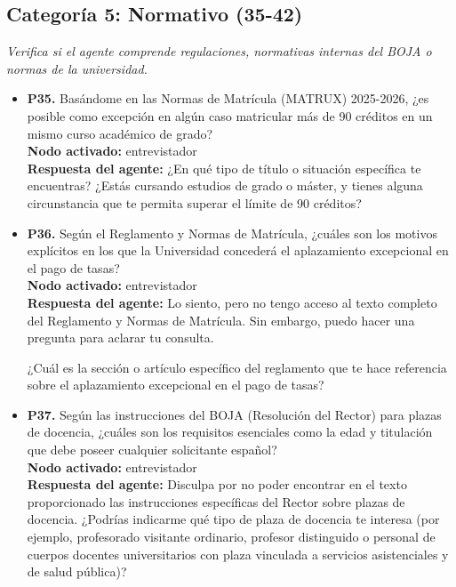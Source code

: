 \documentclass{article}
\begin{document}
\begin{itemize}
\end{itemize}

\subsection{Categoría 5: Normativo (35-42)}
\textit{Verifica si el agente comprende regulaciones, normativas internas del BOJA o normas de la universidad.}
\begin{itemize}
      \item \textbf{P35.} Basándome en las Normas de Matrícula (MATRUX) 2025-2026, ¿es posible como excepción en algún caso matricular más de 90 créditos en un mismo curso académico de grado? \\
            \textbf{Nodo activado:} entrevistador \\
            \textbf{Respuesta del agente:} ¿En qué tipo de título o situación específica te encuentras? ¿Estás cursando estudios de grado o máster, y tienes alguna circunstancia que te permita superar el límite de 90 créditos?

      \item \textbf{P36.} Según el Reglamento y Normas de Matrícula, ¿cuáles son los motivos explícitos en los que la Universidad concederá el aplazamiento excepcional en el pago de tasas? \\
            \textbf{Nodo activado:} entrevistador \\
            \textbf{Respuesta del agente:} Lo siento, pero no tengo acceso al texto completo del Reglamento y Normas de Matrícula. Sin embargo, puedo hacer una pregunta para aclarar tu consulta.

            ¿Cuál es la sección o artículo específico del reglamento que te hace referencia sobre el aplazamiento excepcional en el pago de tasas?

      \item \textbf{P37.} Según las instrucciones del BOJA (Resolución del Rector) para plazas de docencia, ¿cuáles son los requisitos esenciales como la edad y titulación que debe poseer cualquier solicitante español? \\
            \textbf{Nodo activado:} entrevistador \\
            \textbf{Respuesta del agente:} Disculpa por no poder encontrar en el texto proporcionado las instrucciones específicas del Rector sobre plazas de docencia. ¿Podrías indicarme qué tipo de plaza de docencia te interesa (por ejemplo, profesorado visitante ordinario, profesor distinguido o personal de cuerpos docentes universitarios con plaza vinculada a servicios asistenciales y de salud pública)?


\end{itemize}
\end{document}
